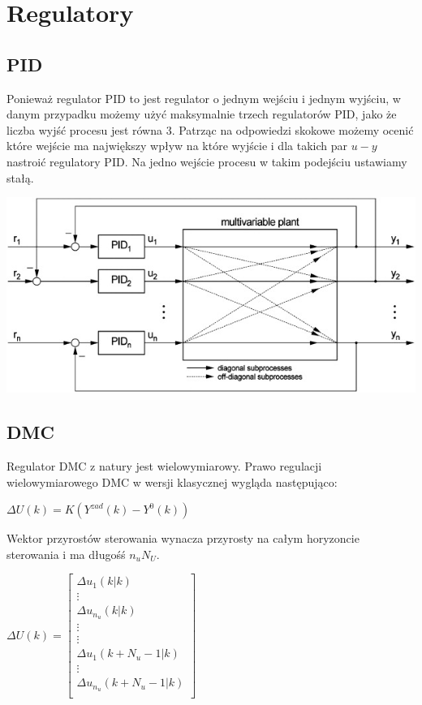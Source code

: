\chapter{Regulatory}

\section{PID}

Ponieważ regulator PID to jest regulator o jednym wejściu i jednym wyjściu, w danym przypadku możemy użyć maksymalnie trzech regulatorów PID, jako że liczba wyjść procesu jest równa 3. Patrząc na odpowiedzi skokowe możemy ocenić które wejście ma największy wpływ na które wyjście i dla takich par $u - y$ nastroić regulatory PID. Na jedno wejście procesu w takim podejściu ustawiamy stałą.

\medskip

\includegraphics{../images/MPID.jpg}

\section{DMC}

Regulator DMC z natury jest wielowymiarowy. Prawo regulacji wielowymiarowego DMC w wersji klasycznej wygląda następująco:

\medskip

\begin{math}
    \Delta U(k) = K(Y^{zad}(k) - Y^0(k))
\end{math}

\medskip

Wektor przyrostów sterowania wynacza przyrosty na całym horyzoncie sterowania i ma długośś $n_uN_U$.

\medskip

\begin{math}
    \Delta U(k) = \begin{bmatrix}
        \Delta u_1(k|k) \\
        \vdots  \\
        \Delta u_{n_u}(k|k) \\
        \vdots  \\
        \vdots  \\
        \Delta u_{1}(k + N_u - 1|k) \\
        \vdots  \\
        \Delta u_{n_u}(k + N_u - 1|k) \\
    \end{bmatrix}
\end{math}

